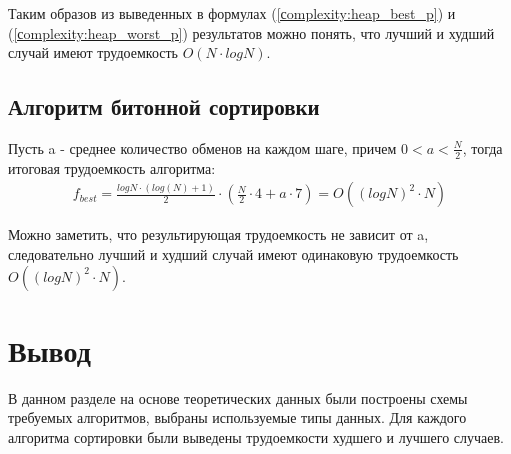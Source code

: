 Таким образов из выведенных в формулах (\ref{сomplexity:heap_best_p}) и (\ref{сomplexity:heap_worst_p}) результатов можно понять, что лучший и худший случай имеют трудоемкость $O(N \cdot log N)$.

\subsection{Алгоритм битонной сортировки}


Пусть a - среднее количество обменов на каждом шаге, причем $0 < a < \frac{N}{2}$, тогда итоговая трудоемкость алгоритма:
\begin{equation}
	\label{сomplexity:bitonic}
	\begin{gathered}
		f_{best} = \frac{log{N} \cdot (log(N) + 1)}{2} \cdot (\frac{N}{2} \cdot 4 + a \cdot 7) = O((log N)^2\cdot N)
	\end{gathered}
\end{equation}

Можно заметить, что результирующая трудоемкость не зависит от a, следовательно лучший и худший случай имеют одинаковую трудоемкость $O((log N)^2\cdot N)$.
\section*{Вывод}

В данном разделе на основе теоретических данных были построены схемы требуемых алгоритмов, выбраны используемые типы данных.
Для каждого алгоритма сортировки были выведены трудоемкости худшего и лучшего случаев.
